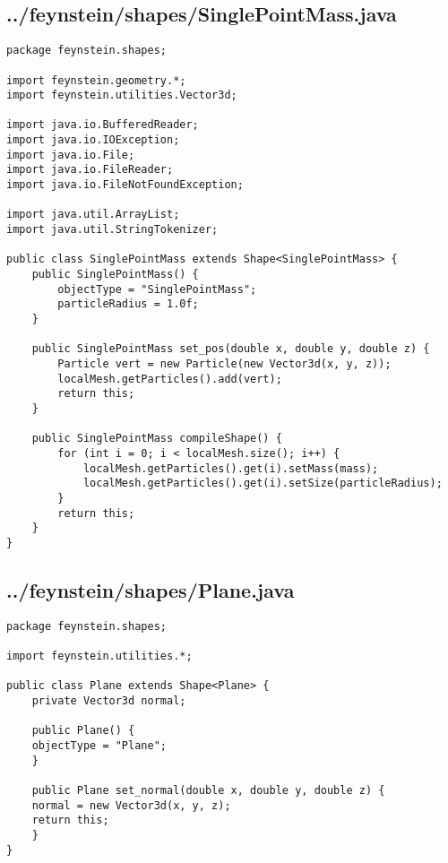 \subsection*{../feynstein/shapes/SinglePointMass.java}
\begin{lstlisting}
package feynstein.shapes;

import feynstein.geometry.*;
import feynstein.utilities.Vector3d;

import java.io.BufferedReader;
import java.io.IOException;
import java.io.File;
import java.io.FileReader;
import java.io.FileNotFoundException;

import java.util.ArrayList;
import java.util.StringTokenizer;

public class SinglePointMass extends Shape<SinglePointMass> {
	public SinglePointMass() {
		objectType = "SinglePointMass";
		particleRadius = 1.0f;
	}
    
	public SinglePointMass set_pos(double x, double y, double z) {
		Particle vert = new Particle(new Vector3d(x, y, z));
		localMesh.getParticles().add(vert);
		return this;
	}

    public SinglePointMass compileShape() {
		for (int i = 0; i < localMesh.size(); i++) {
			localMesh.getParticles().get(i).setMass(mass);
			localMesh.getParticles().get(i).setSize(particleRadius);
		}
		return this;
    }
}\end{lstlisting}

\subsection*{../feynstein/shapes/Plane.java}
\begin{lstlisting}
package feynstein.shapes;

import feynstein.utilities.*;

public class Plane extends Shape<Plane> {
    private Vector3d normal;

    public Plane() {
	objectType = "Plane";
    }	

    public Plane set_normal(double x, double y, double z) {
	normal = new Vector3d(x, y, z);
	return this;
    }
}\end{lstlisting}

